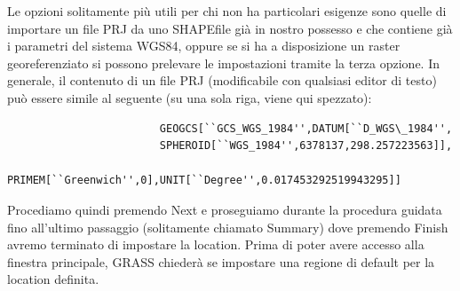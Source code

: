 				Le opzioni solitamente più utili per chi non ha particolari esigenze sono quelle di importare un file PRJ da uno SHAPEfile già in nostro possesso e che contiene già i parametri del sistema WGS84, oppure se si ha a disposizione un raster georeferenziato si possono prelevare le impostazioni tramite la terza opzione. In generale, il contenuto di un file PRJ (modificabile con qualsiasi editor di testo) può essere simile al seguente (su una sola riga, viene qui spezzato):
				
				{\small\begin{verbatim}
						GEOGCS[``GCS_WGS_1984'',DATUM[``D_WGS\_1984'',
						SPHEROID[``WGS_1984'',6378137,298.257223563]],
						PRIMEM[``Greenwich'',0],UNIT[``Degree'',0.017453292519943295]]
					\end{verbatim}}
				
				Procediamo quindi premendo \textsf{Next} e proseguiamo durante la procedura guidata fino all'ultimo passaggio (solitamente chiamato \textsf{Summary}) dove premendo \textsf{Finish} avremo terminato di impostare la location. Prima di poter avere accesso alla finestra principale, GRASS chiederà se impostare una regione di default per la location definita.

				

